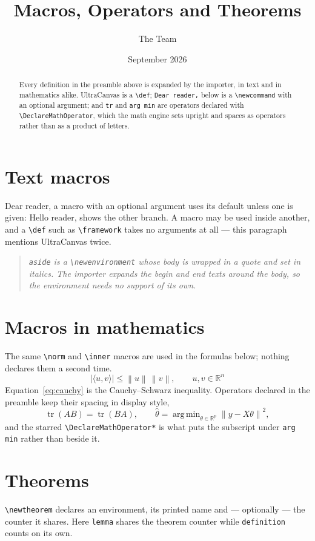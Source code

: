 \documentclass[11pt]{article}
\title{Macros, Operators and Theorems}
\author{The \framework{} Team}
\date{September 2026}
\newcommand{\R}{\mathbb{R}}
\newcommand{\norm}[1]{\left\lVert #1 \right\rVert}
\newcommand{\inner}[2]{\langle #1, #2 \rangle}
\newcommand{\greet}[2][Dear]{#1 #2,}
\def\framework{UltraCanvas}
\DeclareMathOperator{\tr}{tr}
\DeclareMathOperator*{\argmin}{arg\,min}
\newenvironment{aside}{\begin{quote}\itshape}{\end{quote}}
\begin{document}
\maketitle

\begin{abstract}
Every definition in the preamble above is expanded by the importer, in text
and in mathematics alike. \framework{} is a \verb|\def|; \texttt{Dear
reader,} below is a \verb|\newcommand| with an optional argument; and
\texttt{tr} and \texttt{arg\,min} are operators declared with
\verb|\DeclareMathOperator|, which the math engine sets upright and spaces
as operators rather than as a product of letters.
\end{abstract}

\section{Text macros}
\greet{reader} a macro with an optional argument uses its default unless one
is given: \greet[Hello]{reader} shows the other branch. A macro may be used
inside another, and a \verb|\def| such as \verb|\framework| takes no
arguments at all --- this paragraph mentions \framework{} twice.

\begin{aside}
\texttt{aside} is a \verb|\newenvironment| whose body is wrapped in a quote
and set in italics. The importer expands the begin and end texts around the
body, so the environment needs no support of its own.
\end{aside}

\section{Macros in mathematics}\label{sec:math}
The same \verb|\norm| and \verb|\inner| macros are used in the formulas
below; nothing declares them a second time.
\begin{equation}\label{eq:cauchy}
  \left| \inner{u}{v} \right| \le \norm{u} \, \norm{v},
  \qquad u, v \in \R^n
\end{equation}
Equation~\eqref{eq:cauchy} is the Cauchy--Schwarz inequality. Operators
declared in the preamble keep their spacing in display style,
\[
  \tr(AB) = \tr(BA), \qquad
  \hat{\theta} = \argmin_{\theta \in \R^p} \norm{y - X\theta}^2 ,
\]
and the starred \verb|\DeclareMathOperator*| is what puts the subscript
under \texttt{arg\,min} rather than beside it.

\section{Theorems}
\texttt{\textbackslash newtheorem} declares an environment, its printed
name and --- optionally --- the counter it shares. Here \texttt{lemma}
shares the theorem counter while \texttt{definition} counts on its own.
\end{document}
